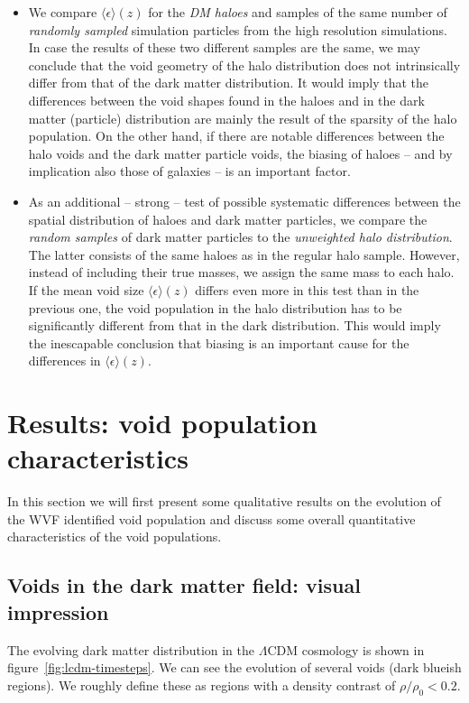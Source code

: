 \begin{itemize}
\item We compare $\langle\epsilon\rangle(z)$ for the \textit{DM haloes} and samples of the same
number of \emph{randomly sampled} simulation particles from the high resolution simulations. In case the results 
of these two different samples are the same, we may conclude that the void geometry of the halo 
distribution does not intrinsically differ from that of the dark matter distribution.
It would imply that the differences between the void shapes found in the haloes and in the 
dark matter (particle) distribution are mainly the result of the sparsity of the halo population. 
On the other hand, if there are notable differences between the halo voids and the dark matter 
particle voids, the biasing of haloes -- and by implication also those of galaxies -- is an 
important factor. 
\item As an additional -- strong -- test of possible systematic differences between the spatial 
distribution of haloes and dark matter particles, we compare the \textit{random samples} of 
dark matter particles to the \textit{unweighted halo distribution}. The latter consists of the 
same haloes as in the regular halo sample. However, instead of including their true masses, 
we assign the same mass to each halo. If the mean void size $\langle\epsilon\rangle(z)$ differs 
even more in this test than in the previous one, the void population in the halo distribution 
has to be significantly different from that in the dark distribution. This would imply the 
inescapable conclusion that biasing is an important cause for the differences in $\langle\epsilon\rangle(z)$.
\end{itemize}

\section{Results: void population characteristics}
\label{sec:analysis_void}
In this section we will first present some qualitative results on the evolution of the 
WVF identified void population and discuss some overall quantitative characteristics of the void populations.

\subsection{Voids in the dark matter field: visual impression}
\label{sec:simqual}

The evolving dark matter distribution in the $\Lambda$CDM cosmology is shown in figure~\ref{fig:lcdm-timesteps}.
We can see the evolution of several voids (dark blueish regions). We roughly define these as regions with a density contrast
of $\rho/\rho_0 < 0.2$.


